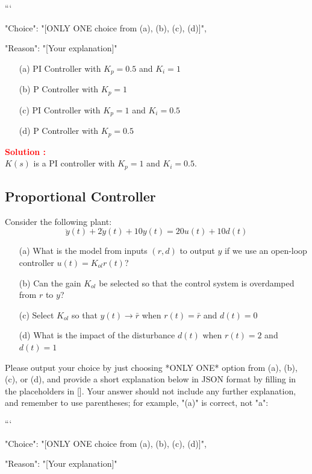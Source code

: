 \documentclass[12pt]{article}
\begin{document}
```
{

"Choice": "[ONLY ONE choice from (a), (b), (c), (d)]",

"Reason": "[Your explanation]"

}

\begin{itemize}
    \item[(a)] PI Controller with \(K_p = 0.5\) and \(K_i = 1\)
    \item[(b)] P Controller with \(K_p = 1\) 
    \item[(c)] PI Controller with \(K_p = 1\) and \(K_i = 0.5\)
    \item[(d)] P Controller with \(K_p = 0.5\) 
\end{itemize}

\textbf{\textcolor{red}{Solution :}} \\
$K(s)$ is a PI controller with $K_p = 1$ and $K_i = 0.5$.
\clearpage

\subsection{Proportional Controller}

Consider the following plant:
\begin{equation}
    \ddot{y}(t) + 2 \dot{y}(t) + 10 y(t) = 20 u(t) + 10 d(t)
\end{equation}
\begin{itemize}
    \item[(a)] What is the model from inputs \((r,d)\) to output \(y\) if we use an open-loop controller \(u(t) = K_{ol}r(t)\)?
    \item[(b)] Can the gain \(K_{ol}\) be selected so that the control system is overdamped from \(r\) to \(y\)?
    \item[(c)] Select \(K_{ol}\) so that \(y(t) \rightarrow \bar{r}\) when \(r(t) = \bar{r}\) and \(d(t) = 0\)
    \item[(d)] What is the impact of the disturbance \(d(t)\) when \(r(t) = 2\) and \(d(t) = 1\)
\end{itemize}
Please output your choice by just choosing *ONLY ONE* option from (a), (b), (c), or (d), and provide a short explanation below in JSON format by filling in the placeholders in []. Your answer should not include any further explanation, and remember to use parentheses; for example, "(a)" is correct, not "a":

```
{

"Choice": "[ONLY ONE choice from (a), (b), (c), (d)]",

"Reason": "[Your explanation]"

}
\end{document}
